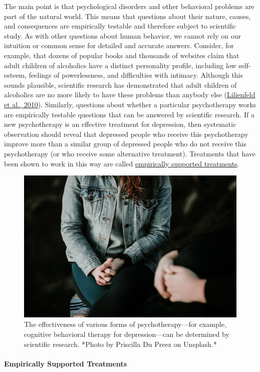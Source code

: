 \documentclass[
]{krantz}
\begin{document}
The main point is that psychological disorders and other behavioral problems are part of the natural world. This means that questions about their nature, causes, and consequences are empirically testable and therefore subject to scientific study. As with other questions about human behavior, we cannot rely on our intuition or common sense for detailed and accurate answers. Consider, for example, that dozens of popular books and thousands of websites claim that adult children of alcoholics have a distinct personality profile, including low self-esteem, feelings of powerlessness, and difficulties with intimacy. Although this sounds plausible, scientific research has demonstrated that adult children of alcoholics are no more likely to have these problems than anybody else (\protect\hyperlink{ref-lilienfeld2010five}{Lilienfeld et al., 2010}). Similarly, questions about whether a particular psychotherapy works are empirically testable questions that can be answered by scientific research. If a new psychotherapy is an effective treatment for depression, then systematic observation should reveal that depressed people who receive this psychotherapy improve more than a similar group of depressed people who do not receive this psychotherapy (or who receive some alternative treatment). Treatments that have been shown to work in this way are called \protect\hyperlink{empirically-supported-treatment}{empirically supported treatments}.

\begin{figure}

{\centering \includegraphics[width=0.5\linewidth]{images/science-of-psych/therapy} 

}

\caption{The effectiveness of various forms of psychotherapy—for example, cognitive behavioral therapy for depression—can be determined by scientific research. *Photo by Priscilla Du Preez on Unsplash.*}\label{fig:therapy}
\end{figure}

\hypertarget{empirically-supported-treatments}{%
\paragraph*{Empirically Supported Treatments}\label{empirically-supported-treatments}}
\end{document}
